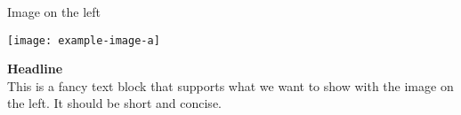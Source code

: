 \begin{frame}[c]{Image on the left}
%
\begin{minipage}{0.5\textwidth}
	\texttt{[image: example-image-a]}
\end{minipage}\hfill
\begin{minipage}{0.45\textwidth}
	\textbf{Headline}\\
	
	This is a fancy text block that supports what we want to show with the image on the left. It should be short and concise.	
\end{minipage}
%
\end{frame}